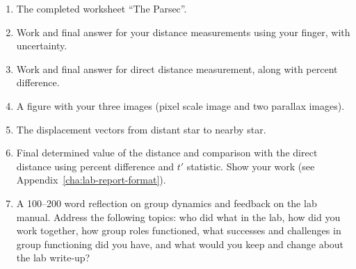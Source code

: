 \begin{enumerate}
	\item The completed worksheet ``The Parsec''.
	\item Work and final answer for your distance measurements using your finger, with uncertainty.
	\item Work and final answer for direct distance measurement, along with percent difference.
	\item A figure with your three images (pixel scale image and two parallax images).
	\item The displacement vectors from distant star to nearby star.
	\item Final determined value of the distance and comparison with the direct distance using percent difference and $t'$ statistic. Show your work (see Appendix~\ref{cha:lab-report-format}).
	\item A 100--200 word reflection on group dynamics and feedback on the lab manual. Address the following topics: who did what in the lab, how did you work together, how group roles functioned, what successes and challenges in group functioning did you have, and what would you keep and change about the lab write-up?
\end{enumerate}